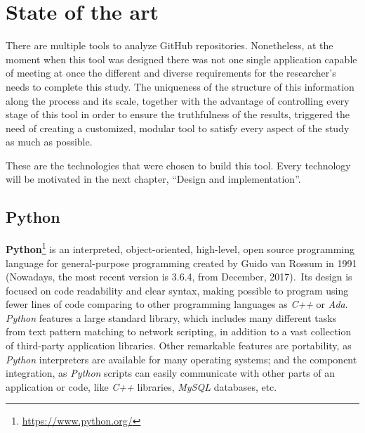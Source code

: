 \documentclass[a4paper, 12pt]{book}
\begin{document}
\chapter{State of the art}
\label{sec:state-art}
There are multiple tools to analyze GitHub repositories. Nonetheless, at the moment when this tool was designed
there was not one single application capable of meeting at once the different and diverse requirements for the
researcher's needs to complete this study.
The uniqueness of the structure of this information along the process and its scale, together with the advantage of
controlling every stage of this tool in order to ensure the truthfulness of the results, triggered the need of
creating a customized, modular tool to satisfy every aspect of the study as much as possible.\par
These are the technologies that were chosen to build this tool. Every technology will be motivated in the next chapter,
``Design and implementation''.
\section{Python}
\label{sec:python}
\textbf{Python}\footnote{\url{https://www.python.org/}} is an interpreted, object-oriented, high-level, open source
programming language for general-purpose programming created by Guido van Rossum in 1991 (Nowadays, the most
recent version is 3.6.4, from December, 2017).\ Its design is focused on code readability and clear syntax, making
possible to program using fewer lines of code comparing to other programming languages as \emph{C++} or \emph{Ada}.\\
\emph{Python} features a large standard library, which includes many different tasks from text pattern matching to network
scripting, in addition to a vast collection of third-party application libraries.
Other remarkable features are portability, as \emph{Python} interpreters are available for many operating systems;
and the component integration, as \emph{Python} scripts can easily communicate with other parts of an application or code,
like \emph{C++} libraries, \emph{MySQL} databases, etc.\\
\end{document}
